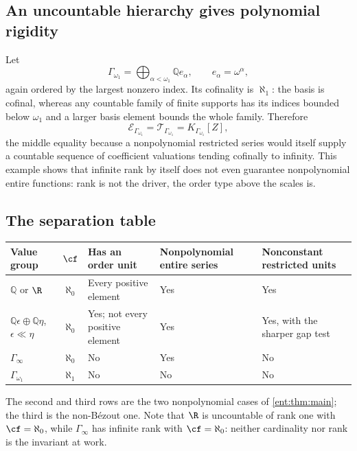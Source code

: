 \documentclass[11pt]{article}
\theoremstyle{plain}
\theoremstyle{plain}
\theoremstyle{plain}
\theoremstyle{definition}
\theoremstyle{definition}
\theoremstyle{definition}
\theoremstyle{definition}
\theoremstyle{remark}
\newcommand{\Q}{\mathbb Q}\newcommand{\Z}{\mathbb Z}\newcommand{\N}{\mathbb N}
\begin{document}
\subsection{An uncountable hierarchy gives polynomial rigidity}
\label{ent:subsec:omega-one}
Let
\begin{equation}\label{ent:eq:Gamma-omegaone}
 \Gamma_{\omega_1}=\bigoplus_{\alpha<\omega_1}\Q e_\alpha,
 \qquad e_\alpha=\omega^\alpha,
\end{equation}
again ordered by the largest nonzero index. Its cofinality is $\aleph_1$: the
basis is cofinal, whereas any countable family of finite supports has its
indices bounded below $\omega_1$ and a larger basis element bounds the whole
family. Therefore
\begin{equation}\label{ent:eq:uncountable-rigidity}
 \mathcal E_{\Gamma_{\omega_1}}
 =\mathcal T_{\Gamma_{\omega_1}}
 =K_{\Gamma_{\omega_1}}[Z],
\end{equation}
the middle equality because a nonpolynomial restricted series would itself
supply a countable sequence of coefficient valuations tending cofinally to
infinity. This example shows that infinite rank by itself does not even
guarantee nonpolynomial entire functions: rank is not the driver, the order
type above the scales is.

\subsection{The separation table}
\label{ent:subsec:table}
\begin{center}\small
\begin{tabularx}{\textwidth}{@{}p{}cYYY@{}}
\toprule
Value group & $\cf$ & Has an order unit & Nonpolynomial entire series &
Nonconstant restricted units\\\midrule
$\Q$ or $\R$ & $\aleph_0$ & Every positive element & Yes & Yes\\[0.45em]
$\Q\epsilon\oplus\Q\eta$, $\epsilon\ll\eta$ & $\aleph_0$ &
Yes; not every positive element & Yes & Yes, with the sharper gap
test\\[0.45em]
$\Gamma_\infty$ & $\aleph_0$ & No & Yes & No\\[0.45em]
$\Gamma_{\omega_1}$ & $\aleph_1$ & No & No & No\\
\bottomrule
\end{tabularx}
\end{center}

The second and third rows are the two nonpolynomial cases of
\cref{ent:thm:main}; the third is the non-B\'ezout one. Note that $\R$ is
uncountable of rank one with $\cf=\aleph_0$, while $\Gamma_\infty$ has
infinite rank with $\cf=\aleph_0$: neither cardinality nor rank is the
invariant at work.
\end{document}
